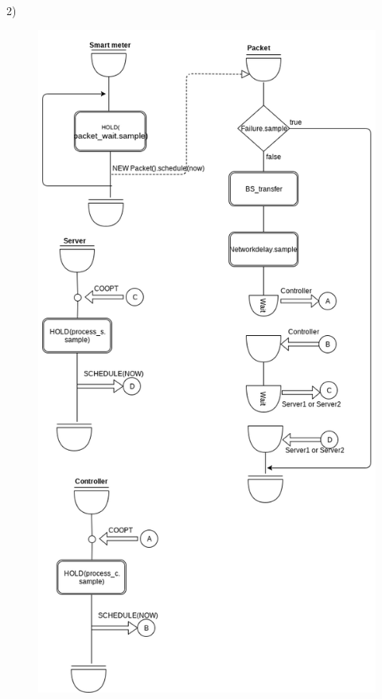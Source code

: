 \documentclass[11pt]{article}
\begin{document}
\newpage

2) 

\begin{figure}[H]
	\includegraphics[width=\textwidth,height=0.9\textheight,keepaspectratio]{activity_diagram_1.png}
	\centering
\end{figure}
\end{document}
